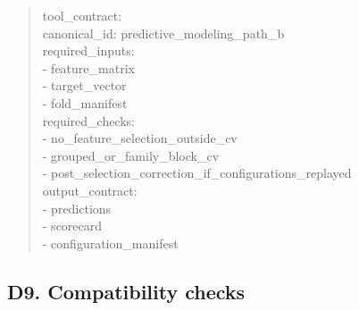 \begin{quote}
tool\_\allowbreak{}contract:\\
canonical\_\allowbreak{}id: predictive\_\allowbreak{}modeling\_\allowbreak{}path\_\allowbreak{}b\\
required\_\allowbreak{}inputs:\\
- feature\_\allowbreak{}matrix\\
- target\_\allowbreak{}vector\\
- fold\_\allowbreak{}manifest\\
required\_\allowbreak{}checks:\\
- no\_\allowbreak{}feature\_\allowbreak{}selection\_\allowbreak{}outside\_\allowbreak{}cv\\
- grouped\_\allowbreak{}or\_\allowbreak{}family\_\allowbreak{}block\_\allowbreak{}cv\\
- post\_\allowbreak{}selection\_\allowbreak{}correction\_\allowbreak{}if\_\allowbreak{}configurations\_\allowbreak{}replayed\\
output\_\allowbreak{}contract:\\
- predictions\\
- scorecard\\
- configuration\_\allowbreak{}manifest
\end{quote}

\subsection{\texorpdfstring{\textbf{D9. Compatibility checks}}{D9. Compatibility checks}}\label{d9.-compatibility-checks}

